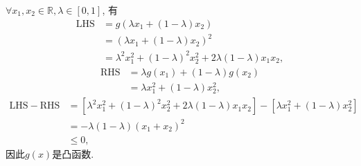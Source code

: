 \begin{enumerate}[label=\alph*)]
        $\forall x_1,x_2\in\mathbb{R},\lambda\in[0,1]$, 有
        \begin{align*}
            \mathrm{LHS}
            &=g(\lambda x_1+(1-\lambda)x_2) \\
            &=(\lambda x_1+(1-\lambda)x_2)^2 \\
            &=\lambda^2 x_1^2+(1-\lambda)^2x_2^2+2\lambda(1-\lambda)x_1x_2,
        \end{align*}
        \begin{align*}
            \mathrm{RHS}
            &=\lambda g(x_1)+(1-\lambda)g(x_2) \\
            &=\lambda x_1^2+(1-\lambda)x_2^2,
        \end{align*}
        \begin{align*}
            \mathrm{LHS}-\mathrm{RHS}
            &=\left[\lambda^2 x_1^2+(1-\lambda)^2x_2^2+2\lambda(1-\lambda)x_1x_2\right]-\left[\lambda x_1^2+(1-\lambda)x_2^2\right] \\
            &=-\lambda(1-\lambda)(x_1+x_2)^2 \\
            &\leq 0,
        \end{align*}
        因此$g(x)$是凸函数.
\end{enumerate}

